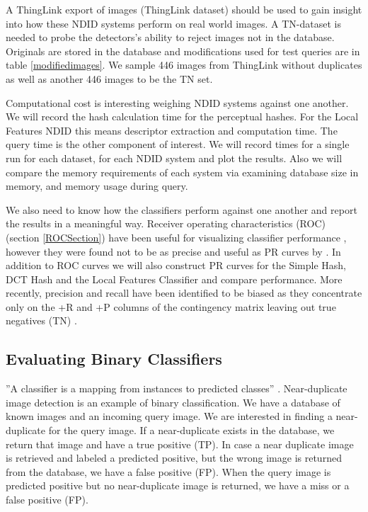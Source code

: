 \documentclass[english,12pt,a4paper,pdftex,elec,utf8, table]{aaltothesis}
\begin{document}
A ThingLink export of images (ThingLink dataset) should be used to gain insight into how these NDID systems perform on real world images. A TN-dataset is needed to probe the detectors's ability to reject images not in the database. Originals are stored in the database and modifications used for test queries are in table \ref{modifiedimages}. We sample 446 images from ThingLink without duplicates as well as another 446 images to be the TN set.

Computational cost is interesting weighing NDID systems against one another. We will record the hash calculation time for the perceptual hashes. For the Local Features NDID this means descriptor extraction and computation time. The query time is the other component of interest. We will record times for a single run for each dataset, for each NDID system and plot the results. Also we will compare the memory requirements of each system via examining database size in memory, and memory usage during query.

We also need to know how the classifiers perform against one another and report the results in a meaningful way. Receiver operating characteristics (ROC) (section \ref{ROCSection}) have been useful for visualizing classifier performance \cite{Fawcett2006}, however they were found not to be as precise and useful as PR curves by \cite{Davis2006}. In addition to ROC curves we will also construct PR curves for the Simple Hash, DCT Hash and the Local Features Classifier and compare performance. More recently, precision and recall have been identified to be biased as they concentrate only on the +R and +P columns of the contingency matrix leaving out true negatives (TN) \cite{POWERS2011}.

\subsection{Evaluating Binary Classifiers}
''A classifier is a mapping from instances to predicted classes'' \cite{Fawcett2006}. Near-duplicate image detection is an example of binary classification. We have a database of known images and an incoming query image. We are interested in finding a near-duplicate for the query image. If a near-duplicate exists in the database, we return that image and have a true positive (TP). In case a near duplicate image is retrieved and labeled a predicted positive, but the wrong image is returned from the database, we have a false positive (FP). When the query image is predicted positive but no near-duplicate image is returned, we have a miss or a false positive (FP).
\end{document}
